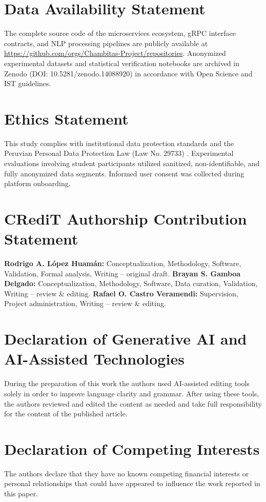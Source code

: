 \documentclass[a4paper,fleqn]{cas-dc}
\begin{document}
\section*{Data Availability Statement}
The complete source code of the microservices ecosystem, gRPC interface contracts, and NLP processing pipelines are publicly available at \url{https://github.com/orgs/Chambitas-Project/repositories}. Anonymized experimental datasets and statistical verification notebooks are archived in Zenodo (DOI: 10.5281/zenodo.14088920) in accordance with Open Science and IST guidelines.

\section*{Ethics Statement}
This study complies with institutional data protection standards and the Peruvian Personal Data Protection Law (Law No. 29733) \cite{ley29733}. Experimental evaluations involving student participants utilized sanitized, non-identifiable, and fully anonymized data segments. Informed user consent was collected during platform onboarding.

\section*{CRediT Authorship Contribution Statement}
\textbf{Rodrigo A. L{\'o}pez Huam{\'a}n:} Conceptualization, Methodology, Software, Validation, Formal analysis, Writing -- original draft. \textbf{Brayan S. Gamboa Delgado:} Conceptualization, Methodology, Software, Data curation, Validation, Writing -- review \& editing. \textbf{Rafael O. Castro Veramendi:} Supervision, Project administration, Writing -- review \& editing.

\section*{Declaration of Generative AI and AI-Assisted Technologies}
During the preparation of this work the authors used AI-assisted editing tools solely in order to improve language clarity and grammar. After using these tools, the authors reviewed and edited the content as needed and take full responsibility for the content of the published article.

\section*{Declaration of Competing Interests}
The authors declare that they have no known competing financial interests or personal relationships that could have appeared to influence the work reported in this paper.
\end{document}
